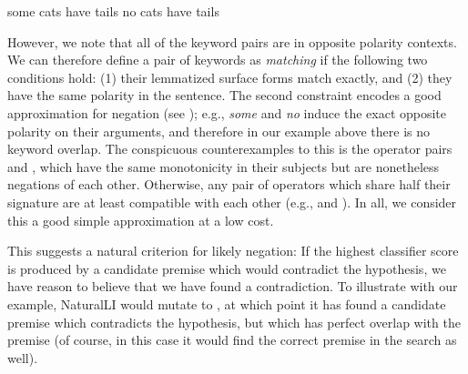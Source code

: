 \entailmentExample
{some cats have tails}
{no cats have tails}

However, we note that all of the keyword pairs are in opposite polarity contexts.
We can therefore define a pair of keywords as \textit{matching} if the following two
  conditions hold: 
  (1) their lemmatized surface forms match exactly, and 
  (2) they have the same polarity in the sentence.
The second constraint encodes a good approximation for negation (see );
  e.g., \textit{some}
  and \textit{no} induce the exact opposite polarity on their arguments,
  and therefore in our example above there is no keyword overlap.
The conspicuous counterexamples to this is the operator pairs  and ,
  which have the same monotonicity in their subjects but are nonetheless negations
  of each other.
Otherwise, any pair of operators which share half their signature are at least
  compatible with each other (e.g.,  and ).
In all, we consider this a good simple approximation at a low cost.

This suggests a natural criterion for likely negation:
  If the highest classifier score is produced by a candidate premise which
  would contradict the hypothesis, we have reason to believe that we have
  found a contradiction.
To illustrate with our example, NaturalLI would mutate 
  to , at which point it has found a candidate premise
  which contradicts the hypothesis, but which has perfect overlap with the 
  premise  (of course, in this case it would find the
  correct premise in the search as well).






